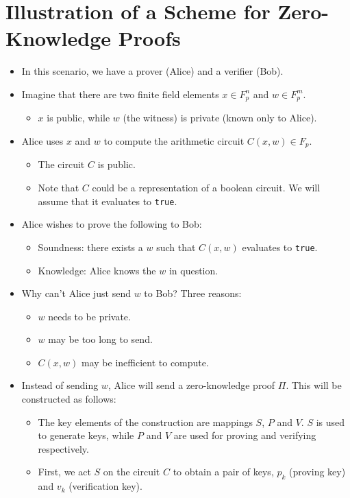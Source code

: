 \documentclass{article}
\begin{document}
\section{Illustration of a Scheme for Zero-Knowledge Proofs}
\begin{itemize}
\item In this scenario, we have a prover (Alice) and a verifier (Bob).
\item Imagine that there are two finite field elements $x\in F_p^n$ and $w \in F_p^m$.
	\begin{itemize}
	\item $x$ is public, while $w$ (the witness) is private (known only to Alice).
	\end{itemize}
\item Alice uses $x$ and $w$ to compute the arithmetic circuit $C(x, w) \in F_p$.
	\begin{itemize}
	\item The circuit $C$ is public.
	\item Note that $C$ could be a representation of a boolean circuit. We will assume that it evaluates to \texttt{true}.
	\end{itemize}
\item Alice wishes to prove the following to Bob:
	\begin{itemize}
	\item Soundness: there exists a $w$ such that $C(x, w)$ evaluates to \texttt{true}.
	\item Knowledge: Alice knows the $w$ in question.
	\end{itemize}
\item Why can't Alice just send $w$ to Bob? Three reasons:
	\begin{itemize}
	\item $w$ needs to be private.
	\item $w$ may be too long to send.
	\item $C(x, w)$ may be inefficient to compute.
	\end{itemize}
\item Instead of sending $w$, Alice will send a zero-knowledge proof $\Pi$. This will be constructed as follows:
	\begin{itemize}
	\item The key elements of the construction are mappings $S$, $P$ and $V$. $S$ is used to generate keys, while $P$ and $V$ are used for proving and verifying respectively.
	\item First, we act $S$ on the circuit $C$ to obtain a pair of keys, $p_k$ (proving key) and $v_k$ (verification key).

\end{itemize}
\end{itemize}
\end{document}
